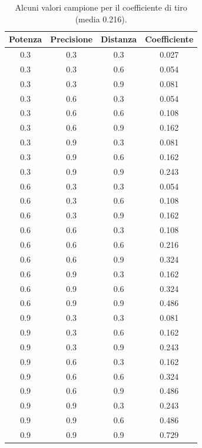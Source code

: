 \documentclass[aps,letterpaper,10pt]{article}
\begin{document}
\begin{table}[H]
\begin{center}
	\begin{tabular}{|c|c|c||c|}
		\hline
		\textbf{Potenza} & \textbf{Precisione} & \textbf{Distanza} & \textbf{Coefficiente} \\ \hline \hline
			0.3 & 0.3 &	0.3 & 0.027 \\ \hline
			0.3 & 0.3 & 0.6 & 0.054 \\ \hline
			0.3 & 0.3 & 0.9 & 0.081 \\ \hline
			0.3 & 0.6 & 0.3 & 0.054 \\ \hline
			0.3 & 0.6 & 0.6 & 0.108 \\ \hline
			0.3 & 0.6 & 0.9 & 0.162 \\ \hline
			0.3 & 0.9 & 0.3 & 0.081 \\ \hline
			0.3 & 0.9 & 0.6 & 0.162 \\ \hline
			0.3 & 0.9 & 0.9 & 0.243 \\ \hline
			0.6 & 0.3 & 0.3 & 0.054 \\ \hline
			0.6 & 0.3 & 0.6 & 0.108 \\ \hline
			0.6 & 0.3 & 0.9 & 0.162 \\ \hline
			0.6 & 0.6 & 0.3 & 0.108 \\ \hline
			0.6 & 0.6 & 0.6 & 0.216 \\ \hline
			0.6 & 0.6 & 0.9 & 0.324 \\ \hline
			0.6 & 0.9 & 0.3 & 0.162 \\ \hline
			0.6 & 0.9 & 0.6 & 0.324 \\ \hline
			0.6 & 0.9 & 0.9 & 0.486 \\ \hline
			0.9 & 0.3 & 0.3 & 0.081 \\ \hline
			0.9 & 0.3 & 0.6 & 0.162 \\ \hline
			0.9 & 0.3 & 0.9 & 0.243 \\ \hline
			0.9 & 0.6 & 0.3 & 0.162 \\ \hline
			0.9 & 0.6 & 0.6 & 0.324 \\ \hline
			0.9 & 0.6 & 0.9 & 0.486 \\ \hline
			0.9 & 0.9 & 0.3 & 0.243 \\ \hline
			0.9 & 0.9 & 0.6 & 0.486 \\ \hline
			0.9 & 0.9 & 0.9 & 0.729 \\ \hline
		\end{tabular}
\end{center}
\caption{Alcuni valori campione per il coefficiente di tiro (media 0.216).}
\end{table}
\end{document}

